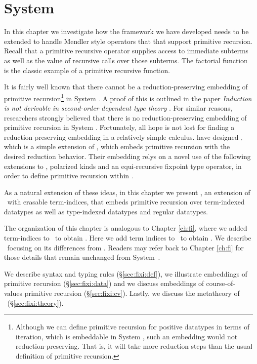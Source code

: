 \chapter{System \Fixi}\label{ch:fixi}

In this chapter we investigate how the framework we have developed needs to be extended
to handle Mendler style operators that that support primitive recursion. Recall that
a primitive recursive operator supplies access to immediate subterms as well as the
value of recursive calls over those subterms. The factorial function is the
classic example of a primitive recursive function.



It is fairly well known that there cannot be a reduction-preserving embedding of
primitive recursion\footnote{
	Although we can define primitive recursion for positive datatypes
	in terms of iteration, which is embeddable in System \F, such an
	embedding would not reduction-preserving. That is, it will take
	more reduction steps than the usual definition of primitive recursion.
	}
in System \F. A proof of this is outlined in the paper 
{\it Induction is not derivable in second-order dependent type theory}
\cite{Geuvers01}. For similar reasons, researchers strongly believed that
there is no reduction-preserving embedding of primitive recursion 
in System \Fw. Fortunately, all hope is not lost
for finding a reduction preserving embedding in a relatively simple calculus. 
\citet{AbeMat04} have designed \Fixw, which is a simple extension of \Fw,
which embeds primitive recursion with the desired reduction behavior.
Their embedding relys on a novel use of the following extensions to \Fw,
polarized kinds and an equi-recursive fixpoint type operator,
in order to define primitive recursion within \Fixw.

As a natural extension of these ideas, in this chapter we present \Fixi,
an extension of \Fixw\ with erasable term-indices,
that embeds primitive recursion over term-indexed datatypes
as well as type-indexed datatypes and regular datatypes.

The organization of this chapter is analogous to Chapter \ref{ch:fi}, 
where we added term-indices to \Fw\ to obtain \Fi. Here
we add term indices to \Fixw\ to obtain \Fixi. We describe \Fixi\ focusing on
its differences from \Fi. Readers may refer back to Chapter \ref{ch:fi} for
those details that remain unchanged from System~\Fi.

We describe syntax and typing rules (\S\ref{sec:fixi:def}),
we illustrate embeddings of primitive recursion (\S\ref{sec:fixi:data})
and we discuss embeddings of course-of-values primitive recursion
(\S\ref{sec:fixi:cv}). Lastly, we
discuss the metatheory of \Fixi\ (\S\ref{sec:fixi:theory}).





